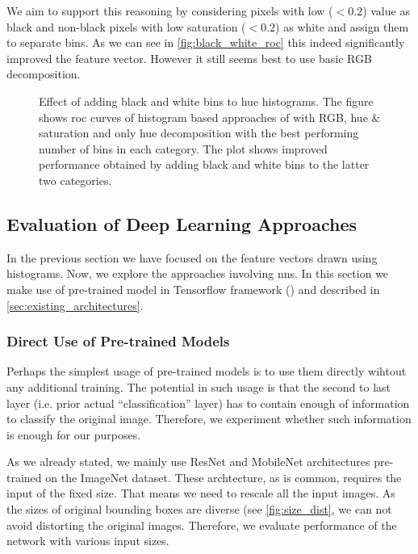 We aim to support this reasoning by considering pixels with low ($< 0.2$)
value as black and non-black pixels with low saturation ($< 0.2$) as white and
assign them to separate bins. As we can see in \autoref{fig:black_white_roc} this indeed
significantly improved the feature vector. However it still seems best to use basic RGB decomposition.

\begin{figure}
    \centering
    \def\svgwidth{\columnwidth}
    
    \caption[Effect of adding black and white bins to hue histograms]{Effect of adding black and white bins to hue histograms. The figure shows \gls{roc} curves of histogram based approaches of with RGB, hue \& saturation and only hue decomposition with the best performing number of bins in each category. The plot shows improved performance obtained by adding black and white bins to the latter two categories.}
    \label{fig:black_white_roc}
\end{figure}

\subsection{Evaluation of Deep Learning Approaches}

In the previous section we have focused on the feature vectors drawn using
histograms. Now, we explore the approaches involving \glspl{nn}. In this
section we make use of pre-trained model in Tensorflow framework
(\cite{tensorflow}) and described in \autoref{sec:existing_architectures}.

\subsubsection{Direct Use of Pre-trained Models}

Perhaps the simplest usage of pre-trained models is to use them directly
wihtout any additional training. The potential in such usage is that the
second to last layer (i.e. prior actual ``classification'' layer) has to
contain enough of information to classify the original image. Therefore,
we experiment whether such information is enough for our purposes.

As we already stated, we mainly use ResNet and MobileNet architectures
pre-trained on the ImageNet dataset. These archtecture, as is common,
requires the input of the fixed size. That means we need to rescale all the
input images. As the sizes of original bounding boxes are diverse (see
\autoref{fig:size_dist}, we can not avoid distorting the original images.
Therefore, we evaluate performance of the network with various input sizes.

